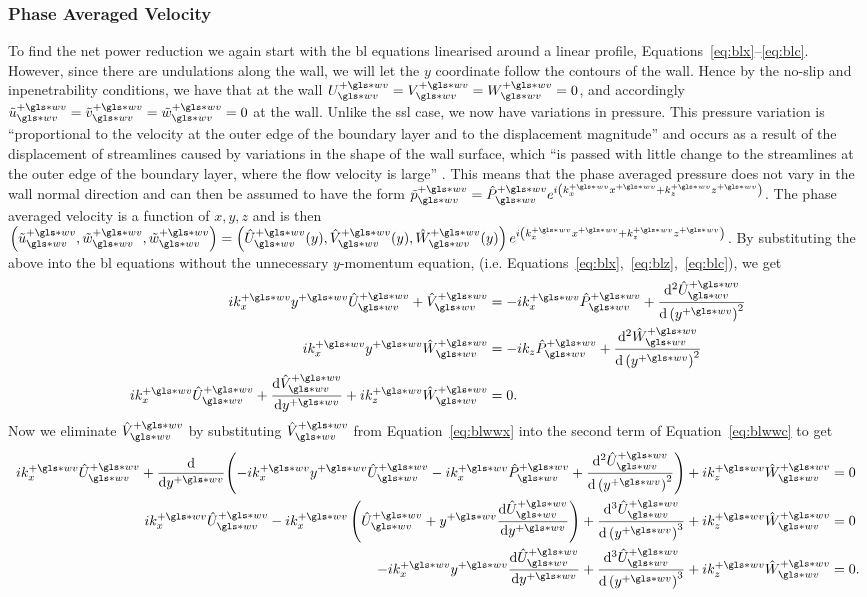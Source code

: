 \subsubsection{Phase Averaged Velocity}
To find the net power reduction we again start with the \gls*{bl} equations linearised around a linear profile, Equations~\eqref{eq:blx}--\eqref{eq:blc}. However, since there are undulations along the wall, we will let the $y$ coordinate follow the contours of the wall. Hence by the no-slip and inpenetrability conditions, we have that at the wall $U\ww\pw=V\ww\pw=W\ww\pw=0$, and accordingly $\tilde{u}\ww\pw=\tilde{v}\ww\pw=\tilde{w}\ww\pw=0$ at the wall. Unlike the \gls*{ssl} case, we now have variations in pressure. This pressure variation is ``proportional to the velocity at the outer edge of the boundary layer and to the displacement magnitude'' and occurs as a result of the displacement of streamlines caused by variations in the shape of the wall surface, which ``is passed with little change to the streamlines at the outer edge of the boundary layer, where the flow velocity is large'' \cite{chernyshenko2013}. %
This means that the phase averaged pressure does not vary in the wall normal direction and can then be assumed to have the form $\tilde{p}\pw\ww=\hat{P}\pw\ww e^{i\left( k_x\pw x\pw +k_z \pw z\pw \right) }$. The phase averaged velocity is a function of  $x,y,z$ and is then $\left( \tilde{u}\pw\ww,\tilde{w}\pw\ww,\tilde{w}\pw\ww \right) = \left( \hat{U}\ww\pw(y),\hat{V}\ww\pw(y),\hat{W}\ww\pw(y) \right)e^{i\left( k_x\pw x\pw +k_z \pw z\pw \right)} $. By substituting the above into the \gls*{bl} equations without the unnecessary  $y$-momentum equation, (i.e. Equations~\eqref{eq:blx},~\eqref{eq:blz},~\eqref{eq:blc}), we get
\begin{align}
	ik_x\pw y\pw \hat{U}\ww\pw+\hat{V}\ww\pw &= -ik_x\pw \hat{P}\ww\pw+\dv[2]{\hat{U}\ww\pw}{\left(y\pw\right)} \label{eq:blwwx}\\
	ik_x\pw y\pw \hat{W}\ww\pw &= -ik_z \hat{P}\ww\pw+\dv[2]{\hat{W}\pw\ww}{\left(y\pw\right)} \label{eq:blwwz}\\
	ik_x\pw \hat{U}\ww\pw + \dv{\hat{V}\ww\pw}{y\pw} + ik_z\pw \hat{W}\ww\pw &=0 \label{eq:blwwc}
.\end{align}
Now we eliminate $\hat{V}\ww\pw$ by substituting $\hat{V}\ww\pw$ from Equation~\eqref{eq:blwwx} into the second term of Equation~\eqref{eq:blwwc} to get
\begin{align}
	ik_x\pw \hat{U}\ww\pw + \dv{y\pw}(-ik_x\pw y\pw \hat{U}\pw\ww  -ik_x\pw \hat{P}\ww\pw+\dv[2]{\hat{U}\ww\pw}{\left(y\pw\right)}) + ik_z\pw \hat{W}\ww\pw &=0 \\
	ik_x\pw \hat{U}\ww\pw -ik_x\pw \left(\hat{U}\pw\ww+y\pw\dv{\hat{U}\pw\ww}{y\pw}\right)  +\dv[3]{\hat{U}\ww\pw}{\left(y\pw\right)} + ik_z\pw \hat{W}\ww\pw &=0 \\
	-ik_x\pw y\pw\dv{\hat{U}\pw\ww}{y\pw}  +\dv[3]{\hat{U}\ww\pw}{\left(y\pw\right)} + ik_z\pw \hat{W}\ww\pw &=0 \label{eq:blwwxc}
.\end{align}

